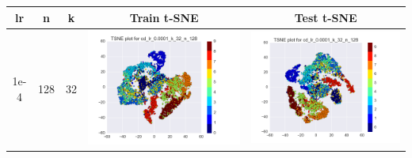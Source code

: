 \documentclass[12pt]{report}
\begin{document}
\begin{table}[H]
  \centering
  \begin{tabular}{ | c | c | c | c || c |}
    \hline
    \textbf{lr} & \textbf{n} & \textbf{k} & \textbf{Train t-SNE} & \textbf{Test t-SNE}\\ \hline
    1e-4 & 128 & 32 &
    \begin{minipage}{.3\textwidth}
      \includegraphics[scale=0.25]{cd_lr_0_0001_k_32_n_128.png}
    \end{minipage} &
    \begin{minipage}{.3\textwidth}
      \includegraphics[scale=0.25]{test_cd_lr_0_0001_k_32_n_128.png}
    \end{minipage}
   \\ \hline
  \end{tabular}
\end{table}
\end{document}
